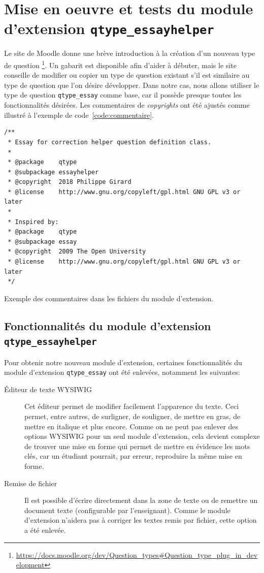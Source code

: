 \chapter{Mise en oeuvre et tests du module d'extension \texttt{qtype\_essayhelper}}

Le site de Moodle donne une br\`eve introduction \`a la cr\'eation d'un nouveau type de question \footnote{\url{https://docs.moodle.org/dev/Question\_types\#Question\_type\_plug\_in\_development}}.
Un gabarit est disponible afin d'aider \`a d\'ebuter, mais le site conseille de modifier ou copier un type de question existant s'il est similaire au type de question que l'on d\'esire d\'evelopper.
Dans notre cas, nous allons utiliser le type de question \texttt{qtype\_essay} comme base, car il poss\`ede presque toutes les fonctionnalit\'es d\'esir\'ees.
Les commentaires de \emph{copyrights} ont \'et\'e ajust\'es comme illustr\'e \`a l'exemple de code~\ref{code:commentaire}.
\begin{lstfloat}
\begin{lstlisting}[frame=l]
/**
 * Essay for correction helper question definition class.
 *
 * @package    qtype
 * @subpackage essayhelper
 * @copyright  2018 Philippe Girard
 * @license    http://www.gnu.org/copyleft/gpl.html GNU GPL v3 or later
 *
 * Inspired by:
 * @package    qtype
 * @subpackage essay
 * @copyright  2009 The Open University
 * @license    http://www.gnu.org/copyleft/gpl.html GNU GPL v3 or later
 */
\end{lstlisting}
\caption{Exemple des commentaires dans les fichiers du module d'extension.}
\label{code:commentaire}
\end{lstfloat}

\section{Fonctionnalit\'es du module d'extension \texttt{qtype\_essayhelper}}
Pour obtenir notre nouveau module d'extension,
certaines fonctionnalit\'es du module d'extension \texttt{qtype\_essay} ont \'et\'e enlev\'ees, notamment les suivantes:
\begin{description}
  \item[\'Editeur de texte WYSIWIG]
  
  Cet \'editeur permet de modifier facilement l'apparence du texte.
  Ceci permet, entre autres, de surligner, de souligner, de mettre en gras, de mettre en italique et plus encore.
  Comme on ne peut pas enlever des options WYSIWIG pour un seul module d'extension, cela devient complexe de trouver une mise en forme qui permet de mettre en \'evidence les mots cl\'es, car un \'etudiant pourrait, par erreur, reproduire la m\^eme mise en forme.
  
  \item[Remise de fichier]
  
  Il est possible d'\'ecrire directement dans la zone de texte ou de remettre un document texte (configurable par l'enseignant).
  Comme le module d'extension n'aidera pas \`a corriger les textes remis par fichier, cette option a \'et\'e enlev\'ee.
\end{description}

